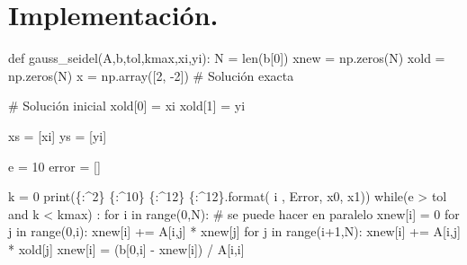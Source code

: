 \documentclass[
  letterpaper,
  DIV=11,
  numbers=noendperiod]{scrreprt}
\newenvironment{Shaded}{\begin{snugshade}}{\end{snugshade}}
\newcommand{\BuiltInTok}[1]{\textcolor[rgb]{0.00,0.23,0.31}{#1}}
\newcommand{\CommentTok}[1]{\textcolor[rgb]{0.37,0.37,0.37}{#1}}
\newcommand{\ControlFlowTok}[1]{\textcolor[rgb]{0.00,0.23,0.31}{#1}}
\newcommand{\DecValTok}[1]{\textcolor[rgb]{0.68,0.00,0.00}{#1}}
\newcommand{\KeywordTok}[1]{\textcolor[rgb]{0.00,0.23,0.31}{#1}}
\newcommand{\NormalTok}[1]{\textcolor[rgb]{0.00,0.23,0.31}{#1}}
\newcommand{\OperatorTok}[1]{\textcolor[rgb]{0.37,0.37,0.37}{#1}}
\newcommand{\SpecialCharTok}[1]{\textcolor[rgb]{0.37,0.37,0.37}{#1}}
\newcommand{\StringTok}[1]{\textcolor[rgb]{0.13,0.47,0.30}{#1}}
\begin{document}
\section{Implementación.}\label{implementaciuxf3n.-1}

\begin{Shaded}
\begin{Highlighting}[]
\KeywordTok{def}\NormalTok{ gauss\_seidel(A,b,tol,kmax,xi,yi):}
\NormalTok{    N }\OperatorTok{=} \BuiltInTok{len}\NormalTok{(b[}\DecValTok{0}\NormalTok{])}
\NormalTok{    xnew }\OperatorTok{=}\NormalTok{ np.zeros(N)}
\NormalTok{    xold }\OperatorTok{=}\NormalTok{ np.zeros(N)}
\NormalTok{    x }\OperatorTok{=}\NormalTok{ np.array([}\DecValTok{2}\NormalTok{, }\OperatorTok{{-}}\DecValTok{2}\NormalTok{]) }\CommentTok{\# Solución exacta}

    \CommentTok{\# Solución inicial}
\NormalTok{    xold[}\DecValTok{0}\NormalTok{] }\OperatorTok{=}\NormalTok{ xi}
\NormalTok{    xold[}\DecValTok{1}\NormalTok{] }\OperatorTok{=}\NormalTok{ yi}

\NormalTok{    xs }\OperatorTok{=}\NormalTok{ [xi]}
\NormalTok{    ys }\OperatorTok{=}\NormalTok{ [yi]}
    
\NormalTok{    e }\OperatorTok{=} \DecValTok{10}
\NormalTok{    error }\OperatorTok{=}\NormalTok{ [] }
    
\NormalTok{    k }\OperatorTok{=} \DecValTok{0}
    \BuiltInTok{print}\NormalTok{(}\StringTok{\textquotesingle{}}\SpecialCharTok{\{:\^{}2\}}\StringTok{ }\SpecialCharTok{\{:\^{}10\}}\StringTok{ }\SpecialCharTok{\{:\^{}12\}}\StringTok{ }\SpecialCharTok{\{:\^{}12\}}\StringTok{\textquotesingle{}}\NormalTok{.}\BuiltInTok{format}\NormalTok{(}\StringTok{\textquotesingle{} i \textquotesingle{}}\NormalTok{, }\StringTok{\textquotesingle{}Error\textquotesingle{}}\NormalTok{, }\StringTok{\textquotesingle{}x0\textquotesingle{}}\NormalTok{, }\StringTok{\textquotesingle{}x1\textquotesingle{}}\NormalTok{))}
    \ControlFlowTok{while}\NormalTok{(e }\OperatorTok{\textgreater{}}\NormalTok{ tol }\KeywordTok{and}\NormalTok{ k }\OperatorTok{\textless{}}\NormalTok{ kmax) :}
        \ControlFlowTok{for}\NormalTok{ i }\KeywordTok{in} \BuiltInTok{range}\NormalTok{(}\DecValTok{0}\NormalTok{,N): }\CommentTok{\# se puede hacer en paralelo}
\NormalTok{            xnew[i] }\OperatorTok{=} \DecValTok{0}
            \ControlFlowTok{for}\NormalTok{ j }\KeywordTok{in} \BuiltInTok{range}\NormalTok{(}\DecValTok{0}\NormalTok{,i):}
\NormalTok{                xnew[i] }\OperatorTok{+=}\NormalTok{ A[i,j] }\OperatorTok{*}\NormalTok{ xnew[j]}
            \ControlFlowTok{for}\NormalTok{ j }\KeywordTok{in} \BuiltInTok{range}\NormalTok{(i}\OperatorTok{+}\DecValTok{1}\NormalTok{,N):}
\NormalTok{                xnew[i] }\OperatorTok{+=}\NormalTok{ A[i,j] }\OperatorTok{*}\NormalTok{ xold[j]                }
\NormalTok{            xnew[i] }\OperatorTok{=}\NormalTok{ (b[}\DecValTok{0}\NormalTok{,i] }\OperatorTok{{-}}\NormalTok{ xnew[i]) }\OperatorTok{/}\NormalTok{ A[i,i]}
            

\end{Highlighting}
\end{Shaded}
\end{document}

